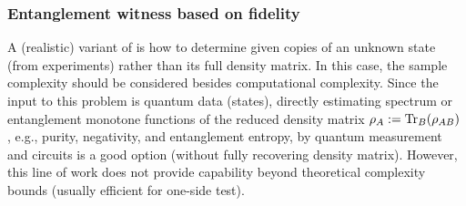 \documentclass[
aps,
pra,
twocolumn,
floatfix,
]{revtex4-2}
\theoremstyle{plain}
\theoremstyle{definition}
\newcommand{\dm}{\rho}
\newcommand{\U}{U}
\begin{document}
\subsubsection{Entanglement witness based on fidelity}\label{sec:entanglement_witness}
A (realistic) variant of  is how to determine  given copies of an unknown state (from experiments) rather than its full density matrix.
In this case, the sample complexity should be considered besides computational complexity.
Since the input to this problem is quantum data (states), directly estimating spectrum or entanglement monotone functions of the reduced density matrix $\rho_A:=\Tr_B(\rho_{AB})$ \cite{ekertDirectEstimationsLinear2002} \cite{horodeckiDirectDetectionQuantum2002} \cite{johriEntanglementSpectroscopyQuantum2017}, e.g., purity, negativity, and entanglement entropy, by quantum measurement and circuits \cite{wang16qubitIBMUniversal2018} \cite{quekMultivariateTraceEstimation2022} is a good option (without fully recovering density matrix).
However, this line of work does not provide capability beyond theoretical complexity bounds  (usually efficient for one-side test).
\end{document}
